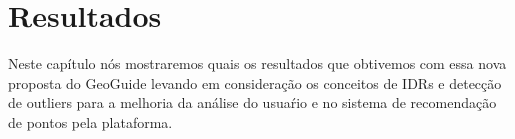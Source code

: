 \chapter{Resultados}


Neste capítulo nós mostraremos quais os resultados que obtivemos com essa nova proposta do GeoGuide levando em consideração os conceitos de IDRs e detecção de outliers para a melhoria da análise do usuaŕio e no sistema de recomendação de pontos pela plataforma.